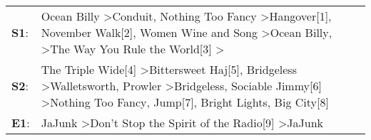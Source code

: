 \begin{supertabular}{p{0.03\textwidth}p{0.92\textwidth}}
 \textbf{S1}:  &        Ocean Billy\textsuperscript{} \textgreater \enspace Conduit\textsuperscript{}, \enspace Nothing Too Fancy\textsuperscript{} \textgreater \enspace Hangover[1]\textsuperscript{}, \enspace November Walk[2]\textsuperscript{}, \enspace Women Wine and Song\textsuperscript{} \textgreater \enspace Ocean Billy\textsuperscript{}, \textsuperscript{} \textgreater \enspace The Way You Rule the World[3]\textsuperscript{} \textgreater {}\textsuperscript{}  \enspace  \\
 \textbf{S2}:  &  The Triple Wide[4]\textsuperscript{} \textgreater \enspace Bittersweet Haj[5]\textsuperscript{}, \enspace Bridgeless\textsuperscript{} \textgreater \enspace Walletsworth\textsuperscript{}, \enspace Prowler\textsuperscript{} \textgreater \enspace Bridgeless\textsuperscript{}, \enspace Sociable Jimmy[6]\textsuperscript{} \textgreater \enspace Nothing Too Fancy\textsuperscript{},  Jump[7]\textsuperscript{}, \enspace Bright Lights, Big City[8]\textsuperscript{}  \enspace  \\
 \textbf{E1}:  &                                                                                                                                                                                                                                                                                                                                       JaJunk\textsuperscript{} \textgreater \enspace Don't Stop the Spirit of the Radio[9]\textsuperscript{} \textgreater \enspace JaJunk\textsuperscript{}  \enspace  \\
\end{supertabular}
